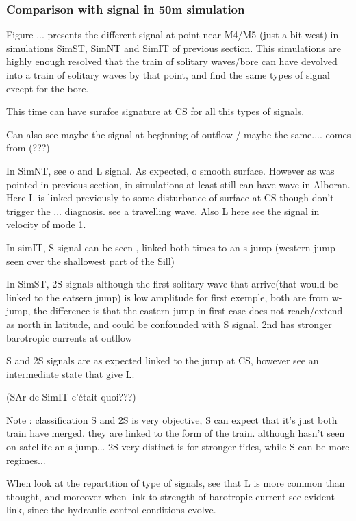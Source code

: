 \subsubsection{Comparison with signal in 50m simulation}
Figure ... presents the different signal at point near M4/M5 (just a bit west) in simulations SimST, SimNT and SimIT of previous section. This simulations are highly enough resolved that the train of solitary waves/bore can have devolved into a train of solitary waves by that point, and find the same types of signal except for the bore.

This time can have surafce signature at CS for all this types of signals.

Can also see maybe the signal at beginning of outflow / maybe the same.... comes from (???)

In SimNT, see o and L signal. As expected, o smooth surface. However as was pointed in previous section, in simulations at least still can have wave in Alboran. Here L is linked previously to some disturbance of surface at CS though don't trigger the ... diagnosis. see a travelling wave. Also L here see the signal in velocity of mode 1.

In simIT, S signal can be seen , linked both times to an s-jump (western jump seen over the shallowest part of the Sill)

In SimST, 2S signals although the first solitary wave that arrive(that would be linked to the eatsern jump) is low amplitude for first exemple, both are from w-jump, the difference is that the eastern jump in first case does not reach/extend as north in latitude, and could be confounded with S signal. 2nd has stronger barotropic currents at outflow


S and 2S signals are as expected linked to the jump at CS, however see an intermediate state that give L.


(SAr de SimIT c'était quoi???)




Note : classification S and 2S is very objective, S can expect that it's just both train have merged. they are linked to the form of the train. although hasn't seen on satellite an s-jump...  2S very distinct is for stronger tides, while S can be more regimes...

When look at the repartition of type of signals, see that L is more common than thought, and moreover when link to strength of barotropic current see evident link, since the hydraulic control conditions evolve.




